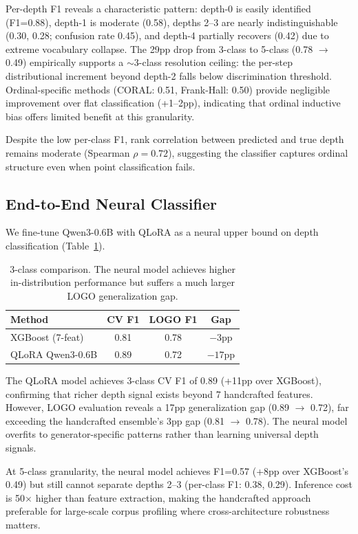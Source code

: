 \documentclass[11pt,a4paper]{article}
\begin{document}
Per-depth F1 reveals a characteristic pattern: depth-0 is easily identified (F1=0.88), depth-1 is moderate (0.58), depths 2--3 are nearly indistinguishable (0.30, 0.28; confusion rate 0.45), and depth-4 partially recovers (0.42) due to extreme vocabulary collapse.
The 29pp drop from 3-class to 5-class (0.78 $\to$ 0.49) empirically supports a $\sim$3-class resolution ceiling: the per-step distributional increment beyond depth-2 falls below discrimination threshold.
Ordinal-specific methods (CORAL: 0.51, Frank-Hall: 0.50) provide negligible improvement over flat classification (+1--2pp), indicating that ordinal inductive bias offers limited benefit at this granularity.

Despite the low per-class F1, rank correlation between predicted and true depth remains moderate (Spearman $\rho = 0.72$), suggesting the classifier captures ordinal structure even when point classification fails.

\subsection{End-to-End Neural Classifier}
\label{sec:neural}

We fine-tune Qwen3-0.6B with QLoRA as a neural upper bound on depth classification (Table~\ref{tab:neural}).

\begin{table}[h]
\centering
\begin{tabular}{lccc}
\toprule
\textbf{Method} & \textbf{CV F1} & \textbf{LOGO F1} & \textbf{Gap} \\
\midrule
XGBoost (7-feat) & 0.81 & 0.78 & $-3$pp \\
QLoRA Qwen3-0.6B & 0.89 & 0.72 & $-17$pp \\
\bottomrule
\end{tabular}
\caption{3-class comparison. The neural model achieves higher in-distribution performance but suffers a much larger LOGO generalization gap.}
\label{tab:neural}
\end{table}

The QLoRA model achieves 3-class CV F1 of 0.89 (+11pp over XGBoost), confirming that richer depth signal exists beyond 7 handcrafted features.
However, LOGO evaluation reveals a 17pp generalization gap (0.89 $\to$ 0.72), far exceeding the handcrafted ensemble's 3pp gap (0.81 $\to$ 0.78).
The neural model overfits to generator-specific patterns rather than learning universal depth signals.

At 5-class granularity, the neural model achieves F1=0.57 (+8pp over XGBoost's 0.49) but still cannot separate depths 2--3 (per-class F1: 0.38, 0.29).
Inference cost is 50$\times$ higher than feature extraction, making the handcrafted approach preferable for large-scale corpus profiling where cross-architecture robustness matters.
\end{document}
